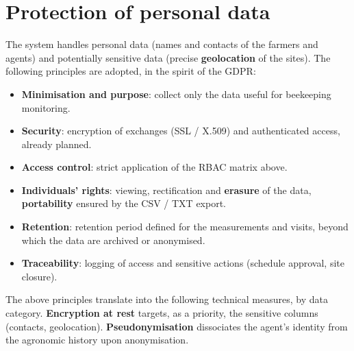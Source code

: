 \section{Protection of personal data}
The system handles personal data (names and contacts of the farmers and agents)
and potentially sensitive data (precise \textbf{geolocation} of the sites). The
following principles are adopted, in the spirit of the GDPR:
\begin{itemize}
  \item \textbf{Minimisation and purpose}: collect only the data useful for beekeeping monitoring.
  \item \textbf{Security}: encryption of exchanges (SSL / X.509) and authenticated access, already planned.
  \item \textbf{Access control}: strict application of the RBAC matrix above.
  \item \textbf{Individuals' rights}: viewing, rectification and \textbf{erasure} of the data, \textbf{portability} ensured by the CSV / TXT export.
  \item \textbf{Retention}: retention period defined for the measurements and visits, beyond which the data are archived or anonymised.
  \item \textbf{Traceability}: logging of access and sensitive actions (schedule approval, site closure).
\end{itemize}

The above principles translate into the following technical measures, by data
category. \textbf{Encryption at rest} targets, as a priority, the sensitive
columns (contacts, geolocation). \textbf{Pseudonymisation} dissociates the
agent's identity from the agronomic history upon anonymisation.

